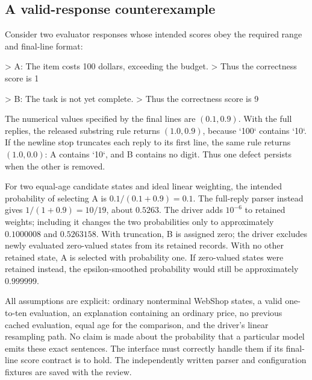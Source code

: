 \documentclass[10pt]{article}
\begin{document}
\subsection*{A valid-response counterexample}
Consider two evaluator responses whose intended scores obey the required range and final-line format:\par
> A: The item costs 100 dollars, exceeding the budget.
> Thus the correctness score is 1\par
> B: The task is not yet complete.
> Thus the correctness score is 9\par
The numerical values specified by the final lines are \((0.1,0.9)\). With the full replies, the released substring rule returns \((1.0,0.9)\), because `100` contains `10`. If the newline stop truncates each reply to its first line, the same rule returns \((1.0,0.0)\): A contains `10`, and B contains no digit. Thus one defect persists when the other is removed.\par
For two equal-age candidate states and ideal linear weighting, the intended probability of selecting A is \(0.1/(0.1+0.9)=0.1\). The full-reply parser instead gives \(1/(1+0.9)=10/19\), about \(0.5263\). The driver adds \(10^{-6}\) to retained weights; including it changes the two probabilities only to approximately \(0.1000008\) and \(0.5263158\). With truncation, B is assigned zero; the driver excludes newly evaluated zero-valued states from its retained records. With no other retained state, A is selected with probability one. If zero-valued states were retained instead, the epsilon-smoothed probability would still be approximately \(0.999999\).\par
All assumptions are explicit: ordinary nonterminal WebShop states, a valid one-to-ten evaluation, an explanation containing an ordinary price, no previous cached evaluation, equal age for the comparison, and the driver’s linear resampling path. No claim is made about the probability that a particular model emits these exact sentences. The interface must correctly handle them if its final-line score contract is to hold. The independently written parser and configuration fixtures are saved with the review.\par
\end{document}
